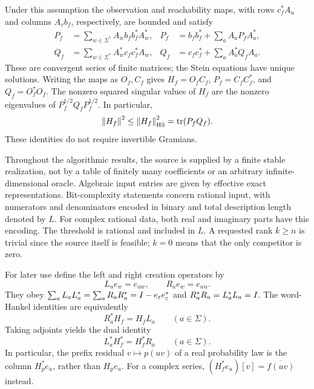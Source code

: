 Under this assumption the observation and reachability maps, with rows
$c_f^*A_u$ and columns $A_vb_f$, respectively, are bounded and satisfy
\begin{align}
P_f&=\sum_{w\in\Sigma^*}A_wb_fb_f^*A_w^*,
&P_f&=b_fb_f^*+\sum_aA_aP_fA_a^*,\label{I:U:eq:sourceP}\\
Q_f&=\sum_{w\in\Sigma^*}A_w^*c_fc_f^*A_w,
&Q_f&=c_fc_f^*+\sum_aA_a^*Q_fA_a.\label{I:U:eq:sourceQ}
\end{align}
These are convergent series of finite matrices; the Stein equations have
unique solutions. Writing the maps as $O_f,C_f$ gives
$H_f=O_fC_f$, $P_f=C_fC_f^*$, and $Q_f=O_f^*O_f$.
The nonzero squared singular values of $H_f$ are the nonzero eigenvalues
of $P_f^{1/2}Q_fP_f^{1/2}$. In particular,
\begin{equation}\label{I:U:eq:trace}
\left\lVert H_f\right\rVert^2\le\left\lVert H_f\right\rVert_{\mathrm{HS}}^2
=\operatorname{tr}(P_fQ_f).
\end{equation}
These identities do not require invertible Gramians.

Throughout the algorithmic results, the source is supplied by a finite
stable realization, not by a table of finitely many coefficients or an
arbitrary infinite-dimensional oracle. Algebraic input entries are given
by effective exact representations. Bit-complexity statements concern
rational input, with numerators and denominators encoded in binary and
total description length denoted by $L$. For complex rational data, both
real and imaginary parts have this encoding. The threshold is rational
and included in $L$. A requested rank $k\ge n$ is trivial since the
source itself is feasible; $k=0$ means that the only competitor is zero.

For later use define the left and right creation operators by
\begin{equation}\label{I:U:eq:shifts}
L_ae_w=e_{aw},\qquad R_ae_w=e_{wa}.
\end{equation}
They obey
$\sum_aL_aL_a^*=\sum_aR_aR_a^*=I-e_\varepsilon e_\varepsilon^*$
and $R_a^*R_a=L_a^*L_a=I$. The word-Hankel identities are equivalently
\begin{equation}\label{I:U:eq:intertwining}
R_a^*H_f=H_fL_a\qquad(a\in\Sigma).
\end{equation}
Taking adjoints yields the dual identity
\begin{equation}\label{I:U:eq:adjoint-intertwining}
L_a^*H_f^*=H_f^*R_a\qquad(a\in\Sigma).
\end{equation}
In particular, the prefix residual $v\mapsto p(uv)$ of a real probability
law is the column $H_p^*e_u$, rather than $H_pe_u$.
For a complex series, $(H_f^*e_u)[v]=\overline{f(uv)}$ instead.


